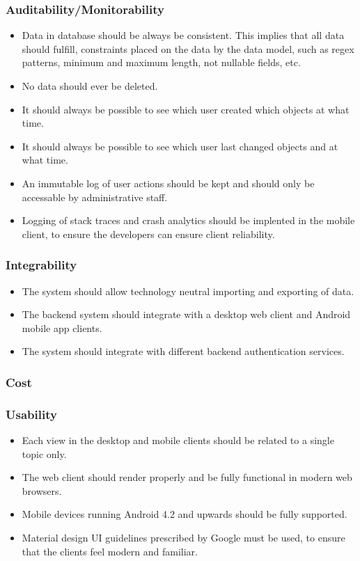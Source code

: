 \documentclass[a4paper,10pt]{article}
\begin{document}
\subsubsection{Auditability/Monitorability}
\begin{itemize}
\item Data in database should be always be consistent. This implies that all data should fulfill, constraints placed on the data by the data model, such as regex patterns, minimum and maximum length, not nullable fields, etc.
\item No data should ever be deleted.
\item It should always be possible to see which user created which objects at what time.
\item It should always be possible to see which user last changed objects and at what time.
\item An immutable log of user actions should be kept and should only be accessable by administrative staff.
\item Logging of stack traces and crash analytics should be implented in the mobile client, to ensure the developers can ensure client reliability.
\end{itemize}

\subsubsection{Integrability}
\begin{itemize}
\item The system should allow technology neutral importing and exporting of data.
\item The backend system should integrate with a desktop web client and Android mobile app clients.
\item The system should integrate with different backend authentication services.
\end{itemize}

\subsubsection{Cost}

\subsubsection{Usability}
\begin{itemize}
\item Each view in the desktop and mobile clients should be related to a single topic only.
\item The web client should render properly and be fully functional in modern web browsers.
\item Mobile devices running Android 4.2 and upwards should be fully supported.
\item Material design UI guidelines prescribed by Google must be used, to ensure that the clients feel modern and familiar. 
\end{itemize}
\end{document}
